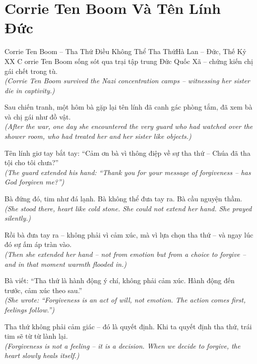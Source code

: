 \section{Corrie Ten Boom Và Tên Lính Đức}
\begin{truyen}{Corrie Ten Boom -- Tha Thứ Điều Không Thể Tha Thứ}{Hà Lan -- Đức, Thế Kỷ XX}
C orrie Ten Boom sống sót qua trại tập trung Đức Quốc Xã -- chứng kiến chị gái chết trong tù.\\
\textit{(Corrie Ten Boom survived the Nazi concentration camps -- witnessing her sister die in captivity.)}

Sau chiến tranh, một hôm bà gặp lại tên lính đã canh gác phòng tắm, đã xem bà và chị gái như đồ vật.\\
\textit{(After the war, one day she encountered the very guard who had watched over the shower room, who had treated her and her sister like objects.)}

Tên lính giơ tay bắt tay: ``Cảm ơn bà vì thông điệp về sự tha thứ -- Chúa đã tha tội cho tôi chưa?''\\
\textit{(The guard extended his hand: ``Thank you for your message of forgiveness -- has God forgiven me?'')}

Bà đứng đó, tim như đá lạnh. Bà không thể đưa tay ra. Bà cầu nguyện thầm.\\
\textit{(She stood there, heart like cold stone. She could not extend her hand. She prayed silently.)}

Rồi bà đưa tay ra -- không phải vì cảm xúc, mà vì lựa chọn tha thứ -- và ngay lúc đó sự ấm áp tràn vào.\\
\textit{(Then she extended her hand -- not from emotion but from a choice to forgive -- and in that moment warmth flooded in.)}

Bà viết: ``Tha thứ là hành động ý chí, không phải cảm xúc. Hành động đến trước, cảm xúc theo sau.''\\
\textit{(She wrote: ``Forgiveness is an act of will, not emotion. The action comes first, feelings follow.'')}

\end{truyen}
\begin{baihoc}
  Tha thứ không phải cảm giác -- đó là quyết định. Khi ta quyết định tha thứ, trái tim sẽ từ từ lành lại.\\
  \textit{(Forgiveness is not a feeling -- it is a decision. When we decide to forgive, the heart slowly heals itself.)}
\end{baihoc}
